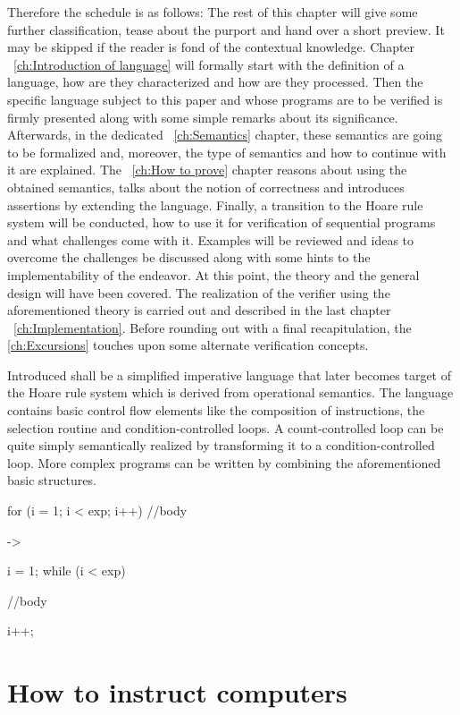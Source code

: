 Therefore the schedule is as follows: The rest of this chapter will give some further classification, tease about the purport and hand over a short preview. It may be skipped if the reader is fond of the contextual knowledge. Chapter ~\ref{ch:Introduction of language} will formally start with the definition of a language, how are they characterized and how are they processed. Then the specific language subject to this paper and whose programs are to be verified is firmly presented along with some simple remarks about its significance. Afterwards, in the dedicated ~\ref{ch:Semantics} chapter, these semantics are going to be formalized and, moreover, the type of semantics and how to continue with it are explained. The ~\ref{ch:How to prove} chapter reasons about using the obtained semantics, talks about the notion of correctness and introduces assertions by extending the language. Finally, a transition to the Hoare rule system will be conducted, how to use it for verification of sequential programs and what challenges come with it.
Examples will be reviewed and ideas to overcome the challenges be discussed along with some hints to the implementability of the endeavor. At this point, the theory and the general design will have been covered. The realization of the verifier using the aforementioned theory is carried out and described in the last chapter ~\ref{ch:Implementation}. Before rounding out with a final recapitulation, the \ref{ch:Excursions} touches upon some alternate verification concepts.

Introduced shall be a simplified imperative language that later becomes target of the Hoare rule system which is derived from operational semantics. The language contains basic control flow elements like the composition of instructions, the selection routine and condition-controlled loops. A count-controlled loop can be quite simply semantically realized by transforming it to a condition-controlled loop. More complex programs can be written by combining the aforementioned basic structures.



for (i = 1; i < exp; i++) {
	//body
}

->

i = 1;
while (i < exp) {
	//body

	i++;
}

\section{How to instruct computers}

